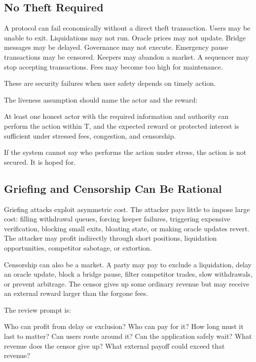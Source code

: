 \subsection{No Theft Required}

A protocol can fail economically without a direct theft transaction. Users may be unable to exit. Liquidations may not run. Oracle prices may not update. Bridge messages may be delayed. Governance may not execute. Emergency pause transactions may be censored. Keepers may abandon a market. A sequencer may stop accepting transactions. Fees may become too high for maintenance.

These are security failures when user safety depends on timely action.

The liveness assumption should name the actor and the reward:

\begin{codeblock}
At least one honest actor with the required information and authority
can perform the action within T, and the expected reward or protected
interest is sufficient under stressed fees, congestion, and censorship.
\end{codeblock}

If the system cannot say who performs the action under stress, the action is not secured. It is hoped for.

\subsection{Griefing and Censorship Can Be Rational}

Griefing attacks exploit asymmetric cost. The attacker pays little to impose large cost: filling withdrawal queues, forcing keeper failures, triggering expensive verification, blocking small exits, bloating state, or making oracle updates revert. The attacker may profit indirectly through short positions, liquidation opportunities, competitor sabotage, or extortion.

Censorship can also be a market. A party may pay to exclude a liquidation, delay an oracle update, block a bridge pause, filter competitor trades, slow withdrawals, or prevent arbitrage. The censor gives up some ordinary revenue but may receive an external reward larger than the forgone fees.

The review prompt is:

\begin{codeblock}
Who can profit from delay or exclusion?
Who can pay for it?
How long must it last to matter?
Can users route around it?
Can the application safely wait?
What revenue does the censor give up?
What external payoff could exceed that revenue?
\end{codeblock}

